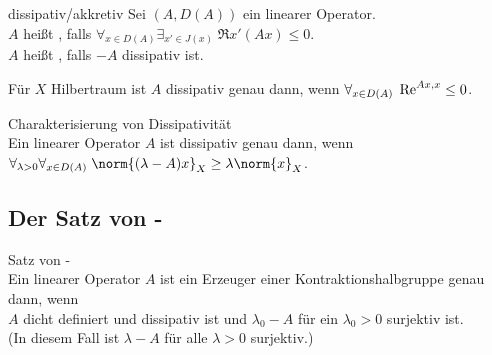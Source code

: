 \linie

\begin{Def}{dissipativ/akkretiv}
    Sei $(A, D(A))$ ein linearer Operator.\\
    $A$ heißt , falls
    $\forall_{x \in D(A)} \exists_{x' \in J(x)}\; \Re x'(Ax) \le 0$.\\
    $A$ heißt , falls $-A$ dissipativ ist.
\end{Def}

\begin{Bem}
    Für $X$ Hilbertraum ist $A$ dissipativ genau dann, wenn
    $\forall_{x \in D(A)}\; \Re \sp{Ax, x} \le 0$.
\end{Bem}


\linie

\begin{Satz}{Charakterisierung von Dissipativität}\\
    Ein linearer Operator $A$ ist dissipativ genau dann, wenn
    $\forall_{\lambda > 0} \forall_{x \in D(A)}\; \norm{(\lambda - A) x}_X \ge \lambda \norm{x}_X$.
\end{Satz}

\pagebreak

\subsection{%
    Der Satz von -%
}

\begin{Satz}{Satz von -}\\
    Ein linearer Operator $A$ ist ein Erzeuger einer Kontraktionshalbgruppe genau dann, wenn\\
    $A$ dicht definiert und dissipativ ist und
    $\lambda_0 - A$ für ein $\lambda_0 > 0$ surjektiv ist.\\
    (In diesem Fall ist $\lambda - A$ für alle $\lambda > 0$ surjektiv.)
\end{Satz}

\linie

